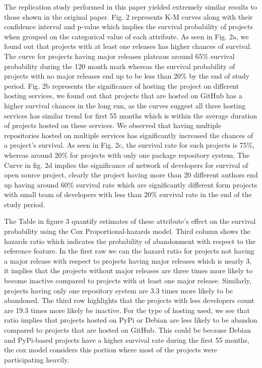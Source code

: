 \documentclass[acmconf]{acmart}
\begin{document}
The replication study performed in this paper yielded extremely similar results to those shown in the original paper. 
Fig. 2 represents K-M curves along with their confidence interval and p-value which implies the survival probability of projects when grouped on the categorical value of each attribute. 
As seen in Fig. 2a, we found out that projects with at least one releases has higher chances of survival. 
The curve for projects having major releases plateaus around 65\% survival probability during the 120 month mark whereas the survival probability of projects with no major releases end up to be less than 20\% by the end of study period. 
Fig. 2b represents the significance of hosting the project on different hosting services, we found out that projects that are hosted on GitHub has a higher survival chances in the long run, as the curves suggest all three hosting services has similar trend for first 55 months which is within the average duration of projects hosted on these services.
We observed that having multiple repositories hosted on multiple services has significantly increased the chances of a project's survival.
As seen in Fig. 2c, the survival rate for such projects is 75\%, whereas around 20\% for projects with only one package repository system. 
The Curve in fig. 2d implies the significance of network of developers for survival of open source project, clearly the project having more than 20 different authors end up having around 60\% survival rate which are significantly different form projects with small team of developers with less than 20\% survival rate in the end of the study period.

The Table in figure 3 quantify estimates of these attribute's effect on the survival probability using the Cox Proportional-hazards model. 
Third column shows the hazards ratio which indicates the probability of abandonment with respect to the reference feature.
In the first raw we can the hazard ratio for projects not having a major release with respect to projects having major releases which is nearly 3, it implies that the projects without major releases are three times more likely to become inactive compared to projects with at least one major release. 
Similarly, projects having only one repository system are 3.3 times more likely to be abandoned.
The third row highlights that the projects with less developers count are 19.3 times more likely be inactive.
For the type of hosting used, we see that ratio implies that projects hosted on PyPi or Debian are less likely to be abandon compared to projects that are hosted on GitHub. This could be because Debian and PyPi-based projects have a higher survival rate during the first 55 months, the cox model considers this portion where most of the projects were participating heavily.
\end{document}
